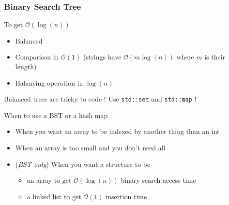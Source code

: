 \documentclass[10pt,svgnames,usenames,table]{beamer} %
\newcommand{\bigoh}{\mathcal{O}}
\begin{document}
\begin{frame}
  \frametitle{Binary Search Tree}
  \begin{center}
\end{center}
  \framebreak

  To get $\bigoh(\log(n))$
  \begin{itemize}
    \item Balanced
    \item Comparison in $\bigoh(1)$ (strings have $\bigoh(m\log(n))$ where $m$ is their length)
    \item Balancing operation in $\log(n)$
  \end{itemize}
  Balanced trees are tricky to code ! Use \lstinline|std::set| and \lstinline|std::map| !

  \begin{block}{When to use a BST or a hash map}
    \begin{itemize}
      \item When you want an array to be indexed by another thing than an int %
      \item When an array is too small and you don't need all %
      \item (\emph{BST only})
        When you want a structure to be
        \begin{itemize}
          \item an array to get $\bigoh(\log(n))$ binary search access time
          \item a linked list to get $\bigoh(1)$ insertion time
        \end{itemize}
    \end{itemize}
  \end{block}
\end{frame}
\end{document}
